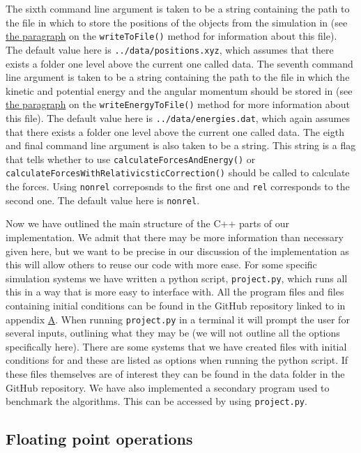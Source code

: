 \documentclass[reprint,english,notitlepage]{revtex4-1}  %
\begin{document}
The sixth command line argument is taken to be a string containing the path to the file in which to store the positions of the objects from the simulation in (see \hyperref[poi:write_to_file]{the paragraph} on the \verb+writeToFile()+ method for information about this file). The default value here is \verb+../data/positions.xyz+, which assumes that there exists a folder one level above the current one called data. The seventh command line argument is taken to be a string containing the path to the file in which the kinetic and potential energy and the angular momentum should be stored in (see \hyperref[poi:write_energy_to_file]{the paragraph} on the \verb+writeEnergyToFile()+ method for more information about this file). The default value here is \verb+../data/energies.dat+, which again assumes that there exists a folder one level above the current one called data. The eigth and final command line argument is also taken to be a string. This string is a flag that tells whether to use \verb+calculateForcesAndEnergy()+ or \verb+calculateForcesWithRelativicsticCorrection()+ should be called to calculate the forces. Using \verb+nonrel+ correposnds to the first one and \verb+rel+ corresponds to the second one. The default value here is \verb+nonrel+.

Now we have outlined the main structure of the C++ parts of our implementation. We admit that there may be more information than necessary given here, but we want to be precise in our discussion of the implementation as this will allow others to reuse our code with more ease. For some specific simulation systems we have written a python script, \verb+project.py+, which runs all this in a way that is more easy to interface with. All the program files and files containing initial conditions can be found in the GitHub repository linked to in appendix \hyperref[A]{A}. When running \verb+project.py+ in a terminal it will prompt the user for several inputs, outlining what they may be (we will not outline all the options specifically here). There are some systems that we have created files with initial conditions for and these are listed as options when running the python script. If these files themselves are of interest they can be found in the data folder in the GitHub repository. We have also implemented a secondary program used to benchmark the algorithms. This can be accessed by using \verb+project.py+. 

\subsection{Floating point operations} \label{sec:III:b}
\end{document}
